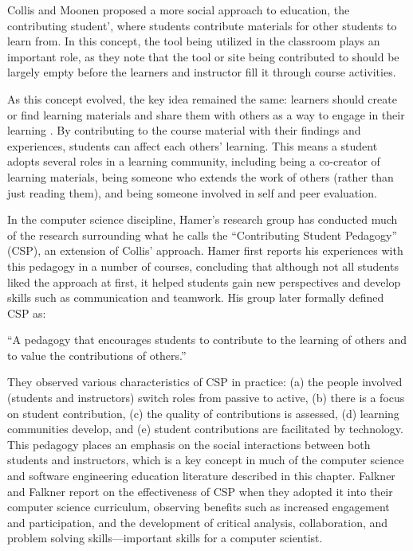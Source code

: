 Collis and Moonen \cite{collis2001flexible} proposed a more social approach to education, the contributing student', where students contribute materials for other students to learn from. In this concept, the tool being utilized in the classroom plays an important role, as they note that the tool or site being contributed to should be largely empty before the learners and instructor fill it through course activities.

As this concept evolved, the key idea remained the same: learners should create or find learning materials and share them with others as a way to engage in their learning \cite{collis2006contributing}. By contributing to the course material with their findings and experiences, students can affect each others' learning. This means a student adopts several roles in a learning community, including being a co-creator of learning materials, being someone who extends the work of others (rather than just reading them), and being someone involved in self and peer evaluation.

In the computer science discipline, Hamer’s research group has conducted much of the research surrounding what he calls the ``Contributing Student Pedagogy'' (CSP), an extension of Collis’ approach. Hamer first reports his experiences \cite{hamer2006some} with this pedagogy in a number of courses, concluding that although not all students liked the approach at first, it helped students gain new perspectives and develop skills such as communication and teamwork. His group later formally defined CSP \cite{hamer2008contributing} as:

``A pedagogy that encourages students to contribute to the learning of others and to value the contributions of others.''

They observed various characteristics of CSP in practice: (a) the people involved (students and instructors) switch roles from passive to active, (b) there is a focus on student contribution, (c) the quality of contributions is assessed, (d) learning communities develop, and (e) student contributions are facilitated by technology. This pedagogy places an emphasis on the social interactions between both students and instructors, which is a key concept in much of the computer science and software engineering education literature described in this chapter. Falkner and Falkner \cite{falkner2012supporting} report on the effectiveness of CSP when they adopted it into their computer science curriculum, observing benefits such as increased engagement and participation, and the development of critical analysis, collaboration, and problem solving skills---important skills for a computer scientist.

